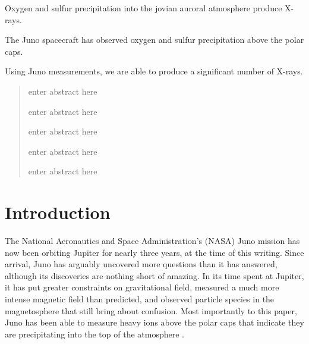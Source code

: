 \documentclass[draft]{agujournal2018}
\begin{document}
\begin{keypoints}
\item Oxygen and sulfur precipitation into the jovian auroral atmosphere produce X-rays.
\item The Juno spacecraft has observed oxygen and sulfur precipitation above the polar caps.
\item Using Juno measurements, we are able to produce a significant number of X-rays.
\end{keypoints}

%
%


\begin{abstract}
enter abstract here


enter abstract here


enter abstract here


enter abstract here


enter abstract here

\end{abstract}



%
%

\section{Introduction}

The National Aeronautics and Space Administration's (NASA) Juno mission has now been orbiting Jupiter for nearly three years, at the time of this writing.
Since arrival, Juno has arguably uncovered more questions than it has answered, although its discoveries are nothing short of amazing.
In its time spent at Jupiter, it has put greater constraints on gravitational field, measured a much more intense magnetic field than predicted, and observed particle species in the magnetosphere that still bring about confusion.
Most importantly to this paper, Juno has been able to measure heavy ions above the polar caps that indicate they are precipitating into the top of the atmosphere \citep{haggerty2017}.
\end{document}
